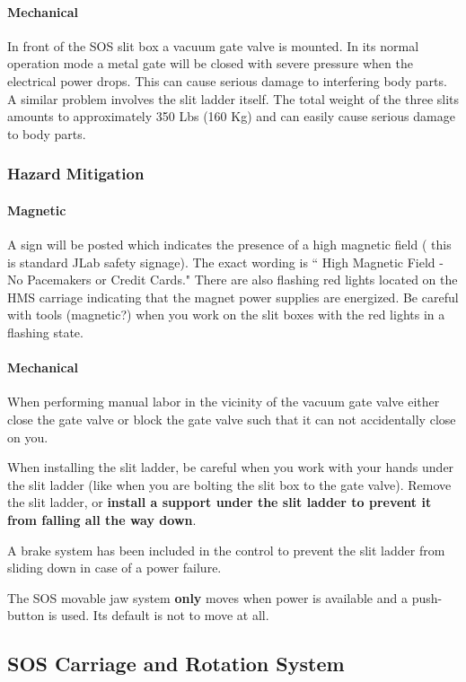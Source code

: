 \paragraph{Mechanical}
In front of the SOS slit box a vacuum gate valve is mounted.
In its normal operation mode a metal gate will be closed with
severe pressure when the electrical power drops. This can cause serious
damage to interfering body parts.
A similar problem involves the slit ladder itself. The total weight of
the three slits amounts to approximately 350 Lbs (160 Kg) and can easily
cause serious damage to body parts.

\subsubsection{Hazard Mitigation}

\paragraph{Magnetic} A sign will be posted which indicates the presence of 
a high magnetic
field ( this is standard JLab safety signage). The exact wording is
`` High Magnetic Field - No Pacemakers or Credit Cards." There are also
flashing red lights located on the HMS carriage indicating that the
magnet power supplies are energized. Be careful with tools (magnetic?)
when you work on the slit boxes with the red lights in a flashing state.

\paragraph{Mechanical} When performing manual labor in the vicinity 
of the vacuum gate
valve either close the gate valve or block the gate valve such that
it can not accidentally close on you.

When installing the slit ladder, be careful when you work with your hands
under the slit ladder (like when you are bolting the slit box to the
gate valve). Remove the slit ladder, or {\bf install a support under the slit
ladder to prevent it from falling all the way down}.

A brake system has been included in the control to prevent the slit ladder
from sliding down in case of a power failure.

The SOS movable jaw system {\bf only} moves when power is available and
a push-button is used. Its default is not to move at all.

\subsection{SOS Carriage and Rotation System }


